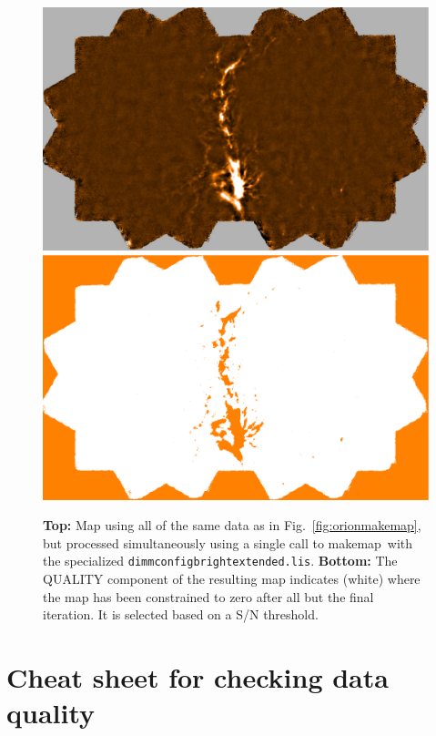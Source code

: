 \documentclass[twoside,11pt]{article}
\newcommand{\xref}[3]{#1}
\newcommand{\xlabel}[1]{}
\renewcommand{\_}{\texttt{\symbol{95}}}
\newcommand{\task}[1]{\textsf{#1}}
\newcommand{\makemap}{\xref{\task{makemap}}{sun258}{MAKEMAP}}
\begin{document}
\begin{figure}
\begin{center}
\includegraphics[width=\linewidth]{sc19_map22+23_brightextended}
\includegraphics[width=\linewidth]{sc19_map22+23_brightextended_mask}
\caption{\textbf{Top:} Map using all of the same data as in
  Fig.~\ref{fig:orionmakemap}, but processed simultaneously using a
  single call to \makemap\ with the specialized
  \texttt{dimmconfig\_bright\_extended.lis}. \textbf{Bottom:} The
  QUALITY component of the resulting map indicates (white) where the
  map has been constrained to zero after all but the final
  iteration. It is selected based on a S/N threshold.}
\label{fig:snrmask}
\end{center}
\end{figure}

\clearpage

\section{\xlabel{dataqual}Cheat sheet for checking data quality}
\label{sec:dataqual}
\end{document}
